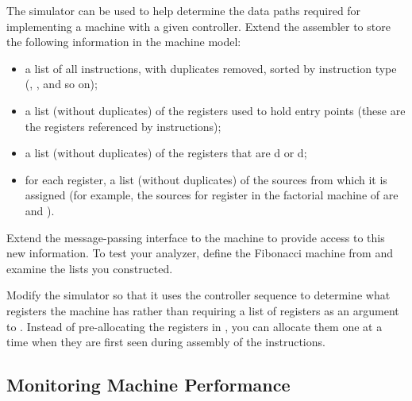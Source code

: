 \begin{exercise}
	\label{Exercise 5.12}
	The simulator can be used to help determine the data paths required for implementing a machine with a given controller.
	Extend the assembler to store the following information in the machine model:
	\begin{itemize}

		\item
			a list of all instructions, with duplicates removed, sorted by instruction type (, , and so on);

		\item
			a list (without duplicates) of the registers used to hold entry points (these are the registers referenced by  instructions);

		\item
			a list (without duplicates) of the registers that are d or d;

		\item
			for each register, a list (without duplicates) of the sources from which it is assigned (for example, the sources for register  in the factorial machine of  are  and ).

	\end{itemize}
	Extend the message-passing interface to the machine to provide access to this new information.
	To test your analyzer, define the Fibonacci machine from  and examine the lists you constructed.
\end{exercise}



\begin{exercise}
	\label{Exercise 5.13}
	Modify the simulator so that it uses the controller sequence to determine what registers the machine has rather than requiring a list of registers as an argument to .
	Instead of pre-allocating the registers in , you can allocate them one at a time when they are first seen during assembly of the instructions.
\end{exercise}



\subsection{Monitoring Machine Performance}
\label{Section 5.2.4}

